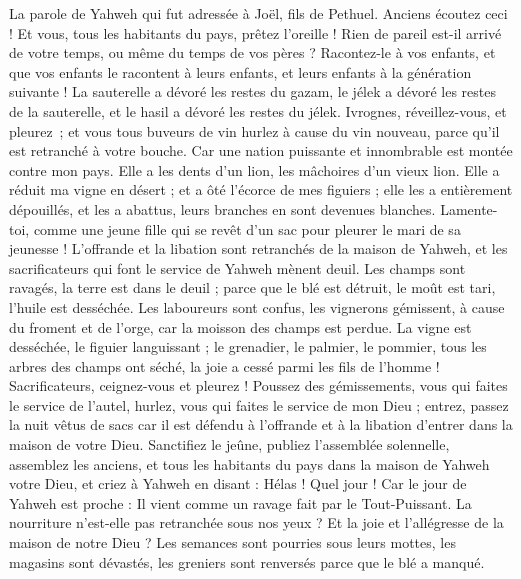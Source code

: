 \begin{multicols}{2}
\VerseOne{}La parole de Yahweh qui fut adressée à Joël, fils de Pethuel.
Anciens écoutez ceci ! Et vous, tous les habitants du pays, prêtez l'oreille ! Rien de pareil est-il arrivé de votre temps, ou même du temps de vos pères ?
Racontez-le à vos enfants, et que vos enfants le racontent à leurs enfants, et leurs enfants à la génération suivante !
La sauterelle a dévoré les restes du gazam, le jélek a dévoré les restes de la sauterelle, et le hasil a dévoré les restes du jélek.
Ivrognes, réveillez-vous, et pleurez ; et vous tous buveurs de vin hurlez à cause du vin nouveau, parce qu’il est retranché à votre bouche.
Car une nation puissante et innombrable est montée contre mon pays. Elle a les dents d’un lion, les mâchoires d’un vieux lion.
Elle a réduit ma vigne en désert ; et a ôté l’écorce de mes figuiers ; elle les a entièrement dépouillés, et les a abattus, leurs branches en sont devenues blanches.
Lamente-toi, comme une jeune fille qui se revêt d'un sac pour pleurer le mari de sa jeunesse !
L'offrande et la libation sont retranchés de la maison de Yahweh, et les sacrificateurs qui font le service de Yahweh mènent deuil.
Les champs sont ravagés, la terre est dans le deuil ; parce que le blé est détruit, le moût est tari, l'huile est desséchée.
Les laboureurs sont confus, les vignerons gémissent, à cause du froment et de l'orge, car la moisson des champs est perdue.
La vigne est desséchée, le figuier languissant ; le grenadier, le palmier, le pommier, tous les arbres des champs ont séché, la joie a cessé parmi les fils de l’homme !
Sacrificateurs, ceignez-vous et pleurez ! Poussez des gémissements, vous qui faites le service de l’autel, hurlez, vous qui faites le service de mon Dieu ; entrez, passez la nuit vêtus de sacs car il est défendu à l'offrande et à la libation d’entrer dans la maison de votre Dieu.
Sanctifiez le jeûne, publiez l’assemblée solennelle, assemblez les anciens, et tous les habitants du pays dans la maison de Yahweh votre Dieu, et criez à Yahweh en disant :
Hélas ! Quel jour ! Car le jour de Yahweh est proche : Il vient comme un ravage fait par le Tout-Puissant.
La nourriture n’est-elle pas retranchée sous nos yeux ? Et la joie et l'allégresse de la maison de notre Dieu ?
Les semances sont pourries sous leurs mottes, les magasins sont dévastés, les greniers sont renversés parce que le blé a manqué.

\end{multicols}
